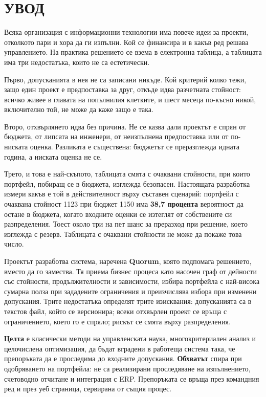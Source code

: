 \section*{УВОД}
\label{sec:introduction}

Всяка организация с информационни технологии има повече идеи за проекти,
отколкото пари и хора да ги изпълни. Кой се финансира и в какъв ред решава
управлението. На практика решението се взема в електронна таблица, а таблицата
има три недостатъка, които не са естетически.

Първо, допусканията в нея не са записани никъде. Кой критерий колко тежи, защо
един проект е предпоставка за друг, откъде идва разчетната стойност: всичко живее
в главата на попълнилия клетките, и шест месеца по-късно никой, включително той,
не може да каже защо е така.

Второ, отхвърлянето идва без причина. Не се казва дали проектът е спрян от
бюджета, от липсата на инженери, от неизпълнена предпоставка или от по-ниската
оценка. Разликата е съществена: бюджетът се преразглежда идната година, а ниската
оценка не се.

Трето, и това е най-скъпото, таблицата смята с очаквани стойности, при които
портфейл, побиращ се в бюджета, изглежда безопасен. Настоящата разработка измери
какъв е той в действителност върху съставен сценарий: портфейл с очаквана стойност
1123 при бюджет 1150 има \textbf{38,7 процента} вероятност да остане в бюджета,
когато входните оценки се изтеглят от собствените си разпределения. Тоест около
три на пет шанс за преразход при решение, което изглежда с резерв. Таблицата с
очаквани стойности не може да покаже това число.

Проектът разработва система, наречена \textbf{Quorum}, която подпомага
решението, вместо да го замества. Тя приема бизнес процеса като насочен граф от
дейности със стойности, продължителности и зависимости, избира портфейла с
най-висока сумарна полза при зададените ограничения и преизчислява избора при
изменени допускания. Трите недостатъка определят трите изисквания: допусканията са
в текстов файл, който се версионира; всеки отхвърлен проект се връща с
ограничението, което го е спряло; рискът се смята върху разпределения.

\textbf{Целта} е класически методи на управленската наука, многокритериален анализ
и целочислена оптимизация, да бъдат вградени в работеща система така, че
препоръката да е проследима до входните допускания. \textbf{Обхватът} спира при
одобряването на портфейла: не са реализирани проследяване на изпълнението,
счетоводно отчитане и интеграция с ERP. Препоръката се връща през командния ред
и през уеб страница, сервирана от същия процес.
